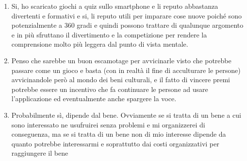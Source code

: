 \documentclass{article}
\begin{document}
\begin{enumerate}
\item Si, ho scaricato giochi a quiz sullo smartphone e li reputo abbastanza divertenti e formativi e si, li reputo utili per imparare cose nuove poiché sono potenzialmente a 360 gradi e quindi possono trattare di qualunque argomento e in più sfruttano il divertimento e la competizione per rendere la comprensione molto più leggera dal punto di vista mentale.
\item Penso che sarebbe un buon escamotage per avvicinarle visto che potrebbe passare come un gioco e basta (con in realtà il fine di acculturare le persone) avvicinandole però al mondo dei beni culturali, e il fatto di vincere premi potrebbe essere un incentivo che fa continuare le persone ad usare l'applicazione ed eventualmente anche spargere la voce.
\item Probabilmente sì, dipende dal bene. Ovviamente se si tratta di un bene a cui sono interessato ne usufruirei senza problemi e mi organizzerei di conseguenza, ma se si tratta di un bene non di mio interesse dipende da quanto potrebbe interessarmi e soprattutto dai costi organizzativi per raggiungere il bene
\end{enumerate}
\end{document}
